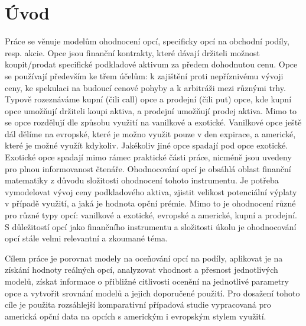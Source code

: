 \documentclass[male,czech,api_bc]{kitheses}
\begin{document}
\chapter{Úvod}


  Práce se věnuje modelům ohodnocení opcí, specificky opcí na obchodní podíly, resp. akcie. Opce jsou finanční kontrakty, které dávají držiteli možnost koupit/prodat specifické podkladové aktivum za předem dohodnutou cenu. Opce se používají především ke třem účelům: k zajištění proti nepříznivému vývoji ceny, ke spekulaci na budoucí cenové pohyby a k arbitráži mezi různými trhy. Typově rozeznáváme kupní (čili call) opce a prodejní (čili put) opce, kde kupní opce umožňují držiteli koupi aktiva, a prodejní umožňují prodej aktiva. Mimo to se opce rozdělují dle způsobu využití na vanilkové a exotické. Vanilkové opce ještě dál dělíme na evropské, které je možno využit pouze v den expirace, a americké, které je možné využít kdykoliv. Jakékoliv jiné opce spadají pod opce exotické. Exotické opce spadají mimo rámec praktické části práce, nicméně jsou uvedeny pro plnou informovanost čtenáře.
  Ohodnocování opcí je obsáhlá oblast finanční matematiky z důvodu složitosti ohodnocení tohoto instrumentu. Je potřeba vymodelovat vývoj ceny podkladového aktiva, zjistit velikost potenciální výplaty v případě využití, a jaká je hodnota opční prémie. Mimo to je ohodnocení různé pro různé typy opcí: vanilkové a exotické, evropské a americké, kupní a prodejní. S důležitostí opcí jako finančního instrumentu a složitosti úkolu je ohodnocování opcí stále velmi relevantní a zkoumané téma.
  
  Cílem práce je porovnat modely na oceňování opcí na podíly, aplikovat je na získání hodnoty reálných opcí, analyzovat vhodnost a přesnost jednotlivých modelů, získat informace o přibližné citlivosti ocenění na jednotlivé parametry opce a vytvořit srovnání modelů a jejich doporučené použití. Pro dosažení tohoto cíle je použita rozsáhlejší komparativní případová studie vypracovaná pro americká opční data na opcích s americkým i evropským stylem využití.
\end{document}
